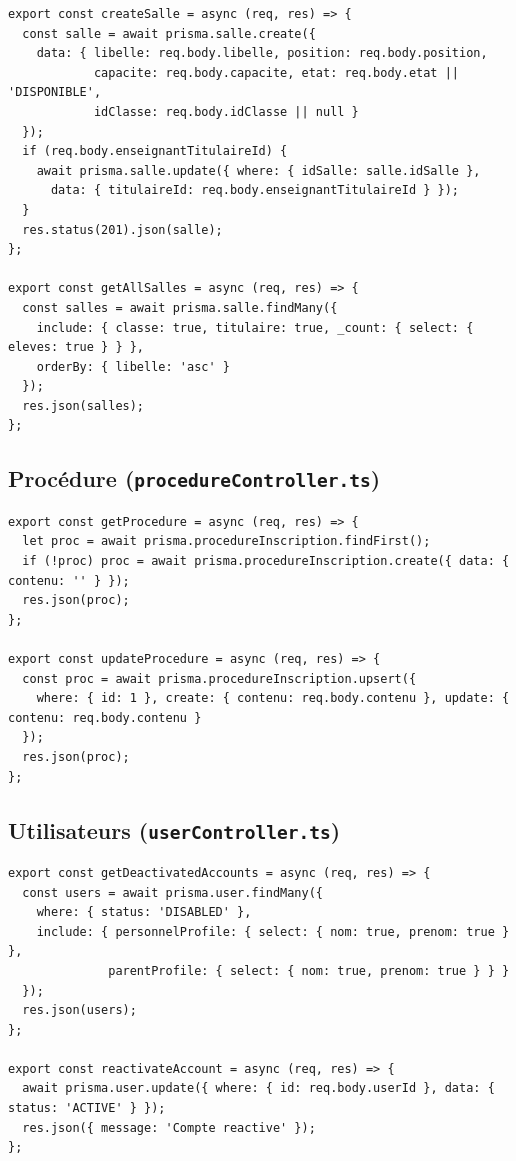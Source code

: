 \documentclass[12pt,a4paper]{article}
\begin{document}
\begin{lstlisting}[style=code]
export const createSalle = async (req, res) => {
  const salle = await prisma.salle.create({
    data: { libelle: req.body.libelle, position: req.body.position,
            capacite: req.body.capacite, etat: req.body.etat || 'DISPONIBLE',
            idClasse: req.body.idClasse || null }
  });
  if (req.body.enseignantTitulaireId) {
    await prisma.salle.update({ where: { idSalle: salle.idSalle },
      data: { titulaireId: req.body.enseignantTitulaireId } });
  }
  res.status(201).json(salle);
};

export const getAllSalles = async (req, res) => {
  const salles = await prisma.salle.findMany({
    include: { classe: true, titulaire: true, _count: { select: { eleves: true } } },
    orderBy: { libelle: 'asc' }
  });
  res.json(salles);
};
\end{lstlisting}

\subsection{Procédure (\texttt{procedureController.ts})}

\begin{lstlisting}[style=code]
export const getProcedure = async (req, res) => {
  let proc = await prisma.procedureInscription.findFirst();
  if (!proc) proc = await prisma.procedureInscription.create({ data: { contenu: '' } });
  res.json(proc);
};

export const updateProcedure = async (req, res) => {
  const proc = await prisma.procedureInscription.upsert({
    where: { id: 1 }, create: { contenu: req.body.contenu }, update: { contenu: req.body.contenu }
  });
  res.json(proc);
};
\end{lstlisting}

\subsection{Utilisateurs (\texttt{userController.ts})}

\begin{lstlisting}[style=code]
export const getDeactivatedAccounts = async (req, res) => {
  const users = await prisma.user.findMany({
    where: { status: 'DISABLED' },
    include: { personnelProfile: { select: { nom: true, prenom: true } },
              parentProfile: { select: { nom: true, prenom: true } } }
  });
  res.json(users);
};

export const reactivateAccount = async (req, res) => {
  await prisma.user.update({ where: { id: req.body.userId }, data: { status: 'ACTIVE' } });
  res.json({ message: 'Compte reactive' });
};
\end{lstlisting}
\end{document}
